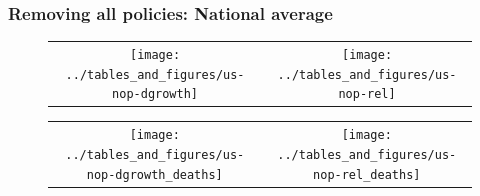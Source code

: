 \documentclass{beamer}
\begin{document}
\begin{frame}
  \frametitle{Removing all policies: National average}


\begin{figure}[ht]
  \begin{minipage}{\linewidth}
    \centering
    \begin{tabular}{cc}
    \texttt{[image: ../tables\_and\_figures/us-nop-dgrowth]}
    &
      \texttt{[image: ../tables\_and\_figures/us-nop-rel]}\\

    \end{tabular}
  \end{minipage}
\end{figure}

\begin{figure}[ht]
  \begin{minipage}{\linewidth}
    \centering
    \begin{tabular}{cc}
    \texttt{[image: ../tables\_and\_figures/us-nop-dgrowth\_deaths]}
      &
      \texttt{[image: ../tables\_and\_figures/us-nop-rel\_deaths]}\\

    \end{tabular}
  \end{minipage}
\end{figure}

\end{frame}




\end{document}

